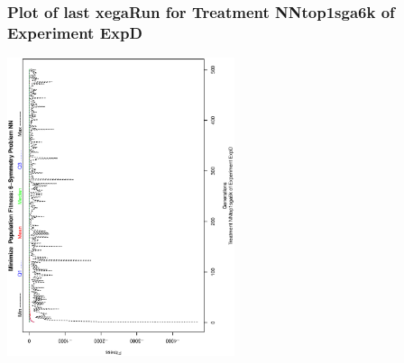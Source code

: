  \begin{frame}
 \frametitle{ Plot of last xegaRun for Treatment NNtop1sga6k of Experiment ExpD }
 \begin{center}
\includegraphics[width=0.5\textwidth, angle=-90]
{ExpDPlotPopStatsFigure004.eps}
 \end{center}
 \label{report/ExpDPlotPopStatsFigure004.eps}  
 \end{frame}

